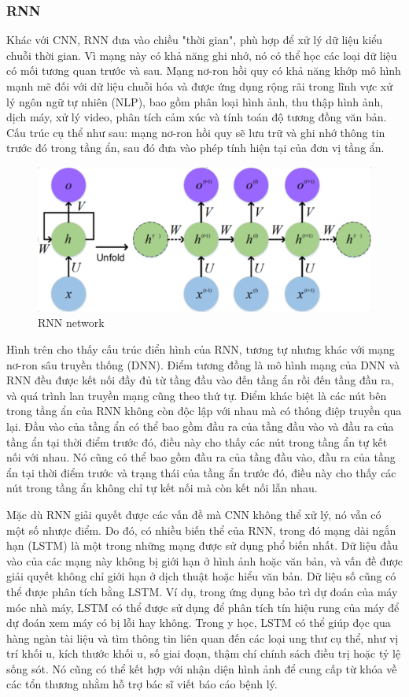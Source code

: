 \documentclass[a4paper]{article}
\begin{document}
\subsubsection{RNN}
Khác với CNN, RNN đưa vào chiều "thời gian", phù hợp để xử lý dữ liệu kiểu chuỗi thời gian. Vì mạng này có khả năng ghi nhớ, nó có thể học các loại dữ liệu có mối tương quan trước và sau. Mạng nơ-ron hồi quy có khả năng khớp mô hình mạnh mẽ đối với dữ liệu chuỗi hóa và được ứng dụng rộng rãi trong lĩnh vực xử lý ngôn ngữ tự nhiên (NLP), bao gồm phân loại hình ảnh, thu thập hình ảnh, dịch máy, xử lý video, phân tích cảm xúc và tính toán độ tương đồng văn bản. Cấu trúc cụ thể như sau: mạng nơ-ron hồi quy sẽ lưu trữ và ghi nhớ thông tin trước đó trong tầng ẩn, sau đó đưa vào phép tính hiện tại của đơn vị tầng ẩn.

\begin{figure}
    \centering
    \includegraphics[width=1\linewidth]{assets/rnn.png}
    \caption{RNN network}
    \label{fig:enter-label}
\end{figure}
Hình trên cho thấy cấu trúc điển hình của RNN, tương tự nhưng khác với mạng nơ-ron sâu truyền thống (DNN). Điểm tương đồng là mô hình mạng của DNN và RNN đều được kết nối đầy đủ từ tầng đầu vào đến tầng ẩn rồi đến tầng đầu ra, và quá trình lan truyền mạng cũng theo thứ tự. Điểm khác biệt là các nút bên trong tầng ẩn của RNN không còn độc lập với nhau mà có thông điệp truyền qua lại. Đầu vào của tầng ẩn có thể bao gồm đầu ra của tầng đầu vào và đầu ra của tầng ẩn tại thời điểm trước đó, điều này cho thấy các nút trong tầng ẩn tự kết nối với nhau. Nó cũng có thể bao gồm đầu ra của tầng đầu vào, đầu ra của tầng ẩn tại thời điểm trước và trạng thái của tầng ẩn trước đó, điều này cho thấy các nút trong tầng ẩn không chỉ tự kết nối mà còn kết nối lẫn nhau.

Mặc dù RNN giải quyết được các vấn đề mà CNN không thể xử lý, nó vẫn có một số nhược điểm. Do đó, có nhiều biến thể của RNN, trong đó mạng dài ngắn hạn (LSTM) là một trong những mạng được sử dụng phổ biến nhất. Dữ liệu đầu vào của các mạng này không bị giới hạn ở hình ảnh hoặc văn bản, và vấn đề được giải quyết không chỉ giới hạn ở dịch thuật hoặc hiểu văn bản. Dữ liệu số cũng có thể được phân tích bằng LSTM. Ví dụ, trong ứng dụng bảo trì dự đoán của máy móc nhà máy, LSTM có thể được sử dụng để phân tích tín hiệu rung của máy để dự đoán xem máy có bị lỗi hay không. Trong y học, LSTM có thể giúp đọc qua hàng ngàn tài liệu và tìm thông tin liên quan đến các loại ung thư cụ thể, như vị trí khối u, kích thước khối u, số giai đoạn, thậm chí chính sách điều trị hoặc tỷ lệ sống sót. Nó cũng có thể kết hợp với nhận diện hình ảnh để cung cấp từ khóa về các tổn thương nhằm hỗ trợ bác sĩ viết báo cáo bệnh lý.
\end{document}
